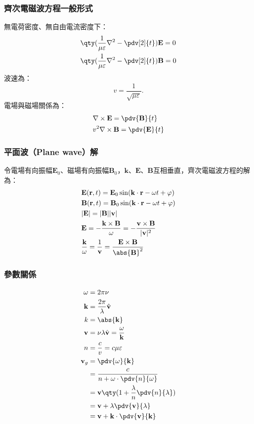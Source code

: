\documentclass[a4paper,12pt]{report}
\begin{document}
\begin{itemize}
\subsubsection{齊次電磁波方程一般形式}
無電荷密度、無自由電流密度下：
\[\begin{aligned}
& \qty(\frac{1}{\mu\varepsilon}\nabla^2-\pdv[2]{t})\mathbf{E}=0\\
& \qty(\frac{1}{\mu\varepsilon}\nabla^2-\pdv[2]{t})\mathbf{B}=0
\end{aligned}\]
波速為：
\[v=\frac{1}{\sqrt{\mu\varepsilon}}.\]
電場與磁場關係為：
\[\begin{aligned}
&\nabla\times\mathbf{E}=\pdv{\mathbf{B}}{t}\\
&v^2\nabla\times\mathbf{B}=\pdv{\mathbf{E}}{t}
\end{aligned}\]
\subsubsection{平面波（Plane wave）解}
令電場有向振幅$\mathbf{E}_0$、磁場有向振幅$\mathbf{B}_0$，$\mathbf{k}$、$\mathbf{E}$、$\mathbf{B}$互相垂直，齊次電磁波方程的解為：
\[\begin{aligned}
&\mathbf{E}(\mathbf{r},t)=\mathbf{E}_0\sin(\mathbf{k}\cdot\mathbf{r}-\omega t+\varphi)\\
&\mathbf{B}(\mathbf{r},t)=\mathbf{B}_0\sin(\mathbf{k}\cdot\mathbf{r}-\omega t+\varphi)\\
&|\mathbf{E}|=|\mathbf{B}||\mathbf{v}|\\
&\mathbf{E}=-\frac{\mathbf{k}\times\mathbf{B}}{\omega}=-\frac{\mathbf{v}\times\mathbf{B}}{|\mathbf{v}|^2}\\
&\frac{\mathbf{k}}{\omega}=\frac{1}{\mathbf{v}}=\frac{\mathbf{E}\times\mathbf{B}}{\abs{\mathbf{B}}^2}
\end{aligned}\]
\subsubsection{參數關係}
\[\begin{aligned}
\omega &= 2\pi \nu \\
\mathbf{k} &= \frac{2\pi}{\lambda}\hat{\mathbf{v}} \\
k &= \abs{\mathbf{k}} \\
\mathbf{v} &= \nu \lambda \hat{\mathbf{v}} = \frac{\omega}{\mathbf{k}}\\
n &= \frac{c}{v} = c\mu\varepsilon\\
\mathbf{v}_g &= \pdv{\omega}{\mathbf{k}} \\
&= \frac{c}{n+\omega\cdot \pdv{n}{\omega}} \\
&= \mathbf{v}\qty(1+\frac{\lambda}{n} \pdv{n}{\lambda}) \\
&= \mathbf{v}+\lambda \pdv{\mathbf{v}}{\lambda} \\
&= \mathbf{v}+\mathbf{k} \cdot\pdv{\mathbf{v}}{\mathbf{k}}
\end{aligned}\]

\end{itemize}
\end{document}
